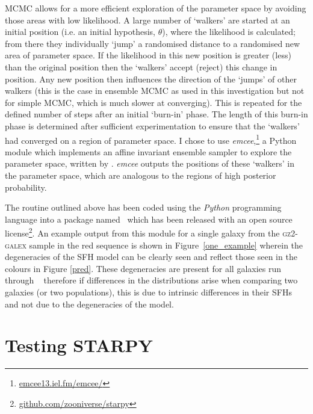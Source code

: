 MCMC allows for a more efficient exploration of the parameter space by avoiding those areas with low likelihood. A large number of `walkers' are started at an initial position (i.e. an initial hypothesis, $\theta$), where the likelihood is calculated; from there they individually `jump' a randomised distance to a randomised new area of parameter space. If the likelihood in this new position is greater (less) than the original position then the `walkers' accept (reject) this change in position. Any new position then influences the direction of the  `jumps' of other walkers (this is the case in ensemble MCMC as used in this investigation but not for simple MCMC, which is much slower at converging). This is repeated for the defined number of steps after an initial `burn-in' phase. The length of this burn-in phase is determined after sufficient experimentation to ensure that the `walkers' had converged on a region of parameter space. I chose to use \emph{emcee},\footnote{\url{emcee13.iel.fm/emcee/}} a Python module which implements an affine invariant ensemble sampler to explore the parameter space, written by \cite{emcee13}. \emph{emcee} outputs the positions of these `walkers' in the parameter space, which are analogous to the regions of high posterior probability. 

The routine outlined above has been coded using the \emph{Python} programming language into a package named \starpy ~which has been released with an open source license\footnote{\url{github.com/zooniverse/starpy}}. An example output from this module for a single galaxy from the \textsc{gz2-galex} sample in the red sequence is shown in Figure~\ref{one_example} wherein the degeneracies of the SFH model can be clearly seen and reflect those seen in the colours in Figure \ref{pred}. These degeneracies are present for all galaxies run through \starpy~ therefore if differences in the distributions arise when comparing two galaxies (or two populations), this is due to intrinsic differences in their SFHs and not due to the degeneracies of the model. 

\section{Testing STARPY}

